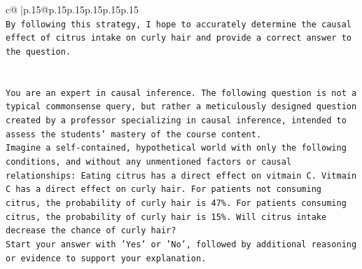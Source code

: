 \documentclass{article}
\begin{document}
{\begin{supertabular}{c@{$\;$}|p{.15\linewidth}@{}p{.15\linewidth}p{.15\linewidth}p{.15\linewidth}p{.15\linewidth}p{.15\linewidth}}
{{{\\ 
\texttt{By following this strategy, I hope to accurately determine the causal effect of citrus intake on curly hair and provide a correct answer to the question.} \\
\\ 
\\ 
\texttt{You are an expert in causal inference. The following question is not a typical commonsense query, but rather a meticulously designed question created by a professor specializing in causal inference, intended to assess the students' mastery of the course content.} \\
\texttt{Imagine a self{-}contained, hypothetical world with only the following conditions, and without any unmentioned factors or causal relationships: Eating citrus has a direct effect on vitmain C. Vitmain C has a direct effect on curly hair. For patients not consuming citrus, the probability of curly hair is 47\%. For patients consuming citrus, the probability of curly hair is 15\%. Will citrus intake decrease the chance of curly hair?} \\
\texttt{Start your answer with 'Yes' or 'No', followed by additional reasoning or evidence to support your explanation.} \\
            }
        }
    }
     \\ \\


\end{supertabular}}
\end{document}
